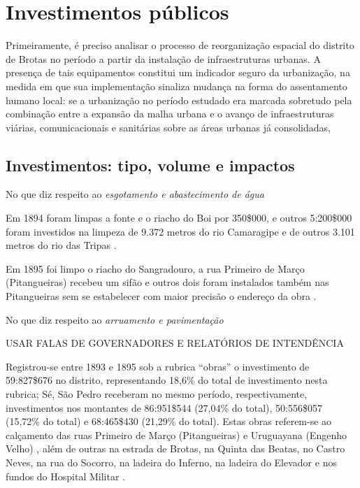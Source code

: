 \section{Investimentos públicos}\label{sec:3.1}

Primeiramente, é preciso analisar o processo de reorganização espacial do distrito de Brotas no período a partir da instalação de infraestruturas urbanas. A presença de tais equipamentos constitui um indicador seguro da urbanização, na medida em que sua implementação sinaliza mudança na forma do assentamento humano local: se a urbanização no período estudado era marcada sobretudo pela combinação entre a expansão da malha urbana e o avanço de infraestruturas viárias, comunicacionais e sanitárias sobre as áreas urbanas já consolidadas, 

\subsection{Investimentos: tipo, volume e impactos}\label{investbrotas}

No que diz respeito ao \textit{esgotamento e abastecimento de água}

Em 1894 foram limpas a fonte e o riacho do Boi por 350\$000, e outros 5:200\$000 foram investidos na limpeza de 9.372 metros do rio Camaragipe e de outros 3.101 metros do rio das Tripas \cite[p.~156]{salvador_relatorio_1894}.

Em 1895 foi limpo o riacho do Sangradouro, a rua Primeiro de Março (Pitangueiras) recebeu um sifão e outros dois foram instalados também nas Pitangueiras sem se estabelecer com maior precisão o endereço da obra \cite[pp.~20, 137-138]{salvador_relatorio_1896}. 





No que diz respeito ao \textit{arruamento e pavimentação}

USAR FALAS DE GOVERNADORES E RELATÓRIOS DE INTENDÊNCIA

Registrou-se entre 1893 e 1895 sob a rubrica ``obras'' o investimento de 59:827\$676 no distrito, representando 18,6\% do total de investimento nesta rubrica; Sé, São Pedro receberam no mesmo período, respectivamente, investimentos nos montantes de 86:951\$544 (27,04\% do total), 50:556\$057 (15,72\% do total) e 68:465\$430 (21,29\% do total). Estas obras referem-se ao calçamento das ruas Primeiro de Março (Pitangueiras) e Uruguayana (Engenho Velho) \cite[pp.~21-23, 138]{salvador_relatorio_1896}, além de outras na estrada de Brotas, na Quinta das Beatas, no Castro Neves, na rua do Socorro, na ladeira do Inferno, na ladeira do Elevador e nos fundos do Hospital Militar \cite[p.~157]{salvador_relatorio_1894}.

